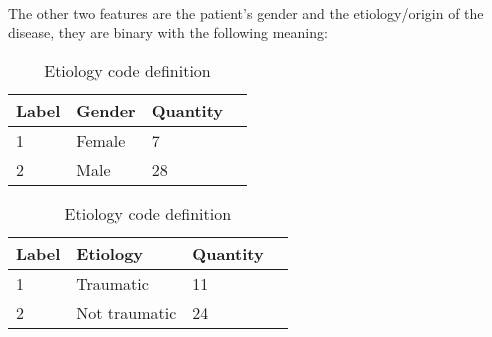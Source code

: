 \paragraph{} The other two features are the patient's gender and the etiology/origin of the disease, they are binary with the following meaning:
\begin{table}[!htb]
    
    \begin{minipage}{.5\linewidth}
      \caption{Gender code definition}
      \centering
       \begin{tabular}{|l|l|l|l}
       \cline{1-3}
Label & Gender & Quantity \\ \hline
1     & Female & 7  \\ \hline
2     & Male   & 28  \\ \hline
\end{tabular}%




\label{tab:Gender}
    \end{minipage}%
    \begin{minipage}{.5\linewidth}
      \centering
        \caption{Etiology code definition}
        \begin{tabular}{|l|l|l|l}
\hline

Label & Etiology      & Quantity \\ \hline
1     & Traumatic     & 11  \\ \hline
2     & Not traumatic & 24  \\ \hline
\end{tabular}%

\label{tab:Etiology}
    \end{minipage} 
\end{table}
